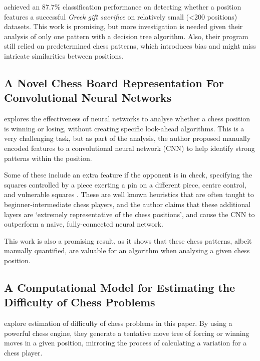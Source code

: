 \citet{middleGamePatterns} achieved an 87.7\% classification performance on
detecting whether a position features a successful \emph{Greek gift sacrifice}
on relatively small (<200 positions) datasets. This work is promising, but more
investigation is needed given their analysis of only one pattern with a
decision tree algorithm. Also, their program still relied on predetermined
chess patterns, which introduces bias and might miss intricate similarities
between positions.

\subsection{A Novel Chess Board Representation For Convolutional Neural
Networks}\label{chessCNNSection}

\citet{chessCNN} explores the effectiveness of neural networks to analyse
whether a chess position is winning or losing, without creating specific
look-ahead algorithms. This is a very challenging task, but as part of the
analysis, the author proposed manually encoded features to a convolutional
neural network (CNN) to help identify strong patterns within the position. 

Some of these include an extra feature if the opponent is in check, specifying
the squares controlled by a piece exerting a pin on a different piece, centre
control, and vulnerable squares \citep{chessCNN}. These are well known
heuristics that are often taught to beginner-intermediate chess players, and
the author claims that these additional layers are `extremely representative of
the chess positions', and cause the CNN to outperform a naive, fully-connected
neural network.

This work is also a promising result, as it shows that these chess patterns,
albeit manually quantified, are valuable for an algorithm when analysing a
given chess position.

\subsection{A Computational Model for Estimating the Difficulty of Chess
Problems} \label{chessTreesOverview}

\citet{chessTrees} explore estimation of difficulty of chess problems in this
paper. By using a powerful chess engine, they generate a tentative move tree of
forcing or winning moves in a given position, mirroring the process of
calculating a variation for a chess player. 


